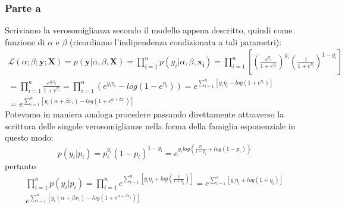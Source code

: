 \subsubsection*{Parte a} 
Scriviamo la verosomiglianza secondo il modello appena descritto, quindi come funzione di $\alpha$ e $\beta$ (ricordiamo l'indipendenza condizionata a tali parametri):
\begin{gather}
\nonumber\mathcal{L}(\alpha;\beta;\mathbf{y};\mathbf{X}) = p(\mathbf{y}|\alpha, \beta, \mathbf{X}) = \prod_{i=1}^{n}p(y_i |\alpha, \beta, \mathbf{x_i}) = \prod_{i=1}^{n}\left[\left(\frac{e^{\eta_i}}{1+e^{\eta_i}}\right)^{y_i}\left(\frac{1}{1+e^{\eta_i}}\right)^{1-y_i}\right] \\
\nonumber=\prod_{i=1}^{n} \frac{e^{y_i\eta_i}}{1+e^{\eta_i}} = \prod_{i=1}^{n}(e^{y_i\eta_i} - log(1-e^{\eta_i})) = e^{\sum_{i=1}^{n}[y_i\eta_i - log(1+e^{\eta_i})]} \\
\nonumber=e^{\sum_{i=1}^{n}[y_i(\alpha+\beta x_i) - log(1+e^{\alpha+\beta x_i})]}
\end{gather}
Potevamo in maniera analoga procedere passando direttamente attraverso la scrittura delle singole verosomiglianze nella forma della famiglia esponenziale in questo modo:
$$p(y_i|p_i) = p_i^{y_i}(1-p_i)^{1-y_i} = e^{y_i log(\frac{p_i}{1-p_i}+log(1-p_i))}$$
pertanto
\begin{gather}
\nonumber \prod_{i=1}^{n} p(y_i|p_i) = \prod_{i=1}^{n} e^{\sum_{i=1}^{n}[y_i \eta_i + log(\frac{1}{1+\eta_i})]} = e^{\sum_{i=1}^{n}[y_i \eta_i + log(1+\eta_i)]}\\
\nonumber e^{\sum_{i=1}^{n}[y_i(\alpha+\beta x_i) - log(1+e^{\alpha+\beta x_i})]}
\end{gather}
